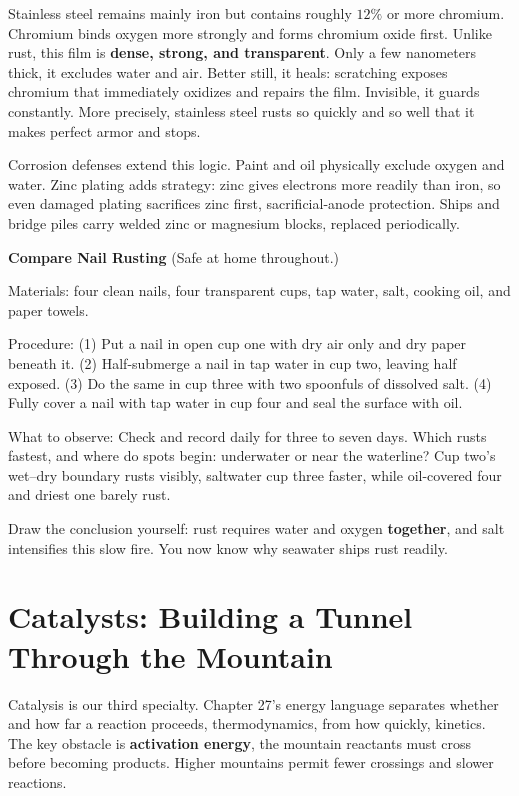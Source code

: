 Stainless steel remains mainly iron but contains roughly $12\%$ or more chromium. Chromium binds oxygen more strongly and forms chromium oxide first. Unlike rust, this film is \textbf{dense, strong, and transparent}. Only a few nanometers thick, it excludes water and air. Better still, it heals: scratching exposes chromium that immediately oxidizes and repairs the film. Invisible, it guards constantly. More precisely, stainless steel rusts so quickly and so well that it makes perfect armor and stops.

Corrosion defenses extend this logic. Paint and oil physically exclude oxygen and water. Zinc plating adds strategy: zinc gives electrons more readily than iron, so even damaged plating sacrifices zinc first, sacrificial-anode protection. Ships and bridge piles carry welded zinc or magnesium blocks, replaced periodically.

\begin{shiyan}
\textbf{Compare Nail Rusting} (Safe at home throughout.)

Materials: four clean nails, four transparent cups, tap water, salt, cooking oil, and paper towels.

Procedure: (1) Put a nail in open cup one with dry air only and dry paper beneath it. (2) Half-submerge a nail in tap water in cup two, leaving half exposed. (3) Do the same in cup three with two spoonfuls of dissolved salt. (4) Fully cover a nail with tap water in cup four and seal the surface with oil.

What to observe: Check and record daily for three to seven days. Which rusts fastest, and where do spots begin: underwater or near the waterline? Cup two's wet--dry boundary rusts visibly, saltwater cup three faster, while oil-covered four and driest one barely rust.

Draw the conclusion yourself: rust requires water and oxygen \textbf{together}, and salt intensifies this slow fire. You now know why seawater ships rust readily.
\end{shiyan}

\section{Catalysts: Building a Tunnel Through the Mountain}

Catalysis is our third specialty. Chapter 27's energy language separates whether and how far a reaction proceeds, thermodynamics, from how quickly, kinetics. The key obstacle is \textbf{activation energy}, the mountain reactants must cross before becoming products. Higher mountains permit fewer crossings and slower reactions.

